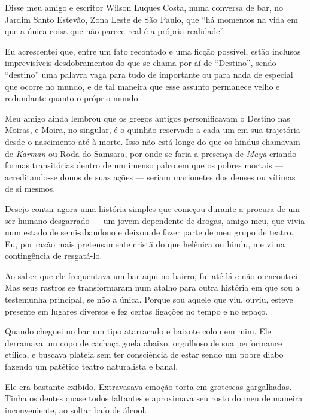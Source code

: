  

Disse meu amigo e escritor Wilson Luques Costa, numa conversa de bar, no
Jardim Santo Estevão, Zona Leste de São Paulo, que ``há momentos na vida
em que a única coisa que não parece real é a própria realidade''.

Eu acrescentei que, entre um fato recontado e uma ficção possível, estão
inclusos imprevisíveis desdobramentos do que se chama por aí de
``Destino'', sendo ``destino'' uma palavra vaga para tudo de importante
ou para nada de especial que ocorre no mundo, e de tal maneira que esse
assunto permanece velho e redundante quanto o próprio mundo.

Meu amigo ainda lembrou que os gregos antigos personificavam o Destino
nas Moiras, e Moira, no singular, é o quinhão reservado a cada um em sua
trajetória desde o nascimento até à morte. Isso não está longe do que os
hindus chamavam de \emph{Karman} ou Roda do Samsara, por onde se faria a
presença de \emph{Maya} criando formas transitórias dentro de um imenso
palco em que os pobres mortais --- acreditando-se donos de suas ações
--- seriam marionetes dos deuses ou vítimas de si mesmos.

\asterisc{}

Desejo contar agora uma história simples que começou durante a procura de
um ser humano desgarrado --- um jovem dependente de drogas, amigo meu,
que vivia num estado de semi-abandono e deixou de fazer parte de meu
grupo de teatro. Eu, por razão mais pretensamente cristã do que helênica
ou hindu, me vi na contingência de resgatá-lo.

Ao saber que ele frequentava um bar aqui no bairro, fui até lá e não o
encontrei. Mas seus rastros se transformaram num atalho para outra
história em que sou a testemunha principal, se não a única. Porque sou
aquele que viu, ouviu, esteve presente em lugares diversos e fez certas
ligações no tempo e no espaço.

\asterisc{}

Quando cheguei no bar um tipo atarracado e baixote colou em mim. Ele
derramava um copo de cachaça goela abaixo, orgulhoso de sua performance
etílica, e buscava plateia sem ter consciência de estar sendo um pobre
diabo fazendo um patético teatro naturalista e banal.

Ele era bastante exibido. Extravasava emoção torta em grotescas
gargalhadas. Tinha os dentes quase todos faltantes e aproximava seu
rosto do meu de maneira inconveniente, ao soltar bafo de álcool.

